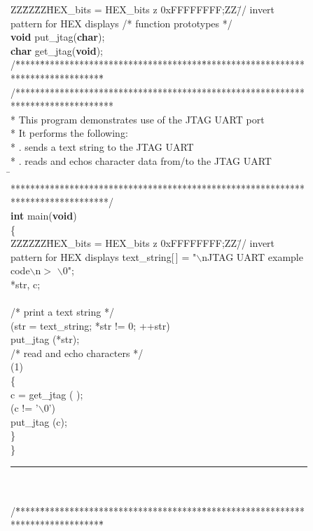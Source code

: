 \pagebreak
\clearpage
\newpage
\begin{figure}[h!]
\begin{center}
\begin{minipage}[t]{12.5 cm}
\begin{tabbing}
ZZ\=ZZ\=ZZ\=HEX\_bits = HEX\_bits z 0xFFFFFFFF;ZZ\=// invert pattern for HEX displays\kill
/* function prototypes */\\
{\bf void} put\_jtag({\bf char});\\
{\bf char} get\_jtag({\bf void});\\
/\=*****\=*********************************\=****************************************\=\kill
/********************************************************************************\\
\>* This program demonstrates use of the JTAG UART port\\
\>* It performs the following: \\
\>* . sends a text string to the JTAG UART\\
\>* . reads and echos character data from/to the JTAG UART\\
\=\kill
\>********************************************************************************/\\
{\bf int} main({\bf void})\\
\{\\
ZZ\=ZZ\=ZZ\=HEX\_bits = HEX\_bits z 0xFFFFFFFF;ZZ\=// invert pattern for HEX displays\kill
{} text\_string[$\,$] = "$\backslash$nJTAG UART example code$\backslash$n$>$ $\backslash$0";\\
 *str, c;\\
~\\
\>/* print a text string */\\
 (str = text\_string; *str != 0; ++str)\\
\>\>put\_jtag (*str);
~\\
\>/* read and echo characters */\\
 (1)\\
\>\{\\
\>\>c = get\_jtag ( );\\
\> (c != '$\backslash$0')\\
\>\>\>put\_jtag (c);\\
\>\}\\
\}
\rule{6.0in}{0in}~\\\\
/\=*****\=*********************************\=****************************************\=\kill

\end{tabbing}
\end{minipage}
\end{center}
\end{figure}
